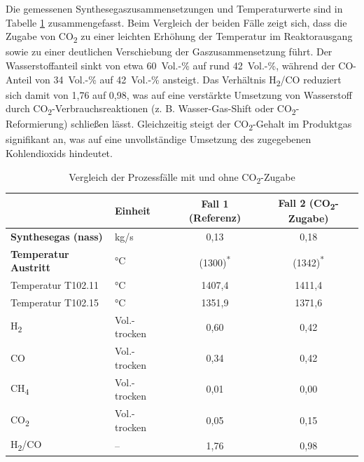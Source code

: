         Die gemessenen Synthesegaszusammensetzungen und Temperaturwerte sind in Tabelle \ref{tab:messwerte} zusammengefasst.  
        Beim Vergleich der beiden Fälle zeigt sich, dass die Zugabe von CO\textsubscript{2} zu einer leichten Erhöhung der Temperatur im Reaktorausgang sowie zu einer deutlichen Verschiebung der Gaszusammensetzung führt.  
        Der Wasserstoffanteil sinkt von etwa 60~Vol.-\% auf rund 42~Vol.-\%, während der CO-Anteil von 34~Vol.-\% auf 42~Vol.-\% ansteigt.  
        Das Verhältnis H\textsubscript{2}/CO reduziert sich damit von 1,76 auf 0,98, was auf eine verstärkte Umsetzung von Wasserstoff durch CO\textsubscript{2}-Verbrauchsreaktionen (z. B. Wasser-Gas-Shift oder CO\textsubscript{2}-Reformierung) schließen lässt.  
        Gleichzeitig steigt der CO\textsubscript{2}-Gehalt im Produktgas signifikant an, was auf eine unvollständige Umsetzung des zugegebenen Kohlendioxids hindeutet.
        
        \begin{table}[H]
            \centering
            \caption{Vergleich der Prozessfälle mit und ohne CO\textsubscript{2}-Zugabe \cite{gonzales}}
            \label{tab:messwerte}
            \begin{tabular}{l l c c}
            \toprule
             & \textbf{Einheit} & \textbf{Fall 1 (Referenz)} & \textbf{Fall 2 (CO\textsubscript{2}-Zugabe)} \\
            \midrule
            \textbf{Synthesegas (nass)} & kg/s & 0{,}13 & 0{,}18 \\
            \textbf{Temperatur Austritt} & °C & (1300)\textsuperscript{*} & (1342)\textsuperscript{*} \\
            Temperatur T102.11 & °C & 1407{,}4 & 1411{,}4 \\
            Temperatur T102.15 & °C & 1351{,}9 & 1371{,}6 \\
            \midrule
            H\textsubscript{2} & Vol.- trocken & 0{,}60 & 0{,}42 \\
            CO & Vol.- trocken & 0{,}34 & 0{,}42 \\
            CH\textsubscript{4} & Vol.- trocken & 0{,}01 & 0{,}00 \\
            CO\textsubscript{2} & Vol.- trocken & 0{,}05 & 0{,}15 \\
            \midrule
            H\textsubscript{2}/CO & – & 1{,}76 & 0{,}98 \\
            \bottomrule
            \end{tabular}
        \end{table}
        
